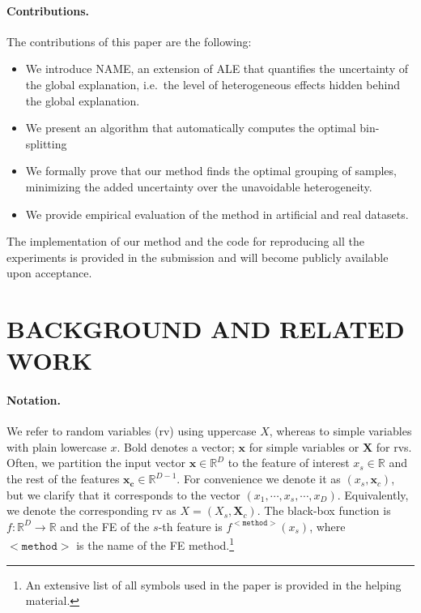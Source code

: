 \documentclass[twoside]{article}
\newcommand{\xc}{\mathbf{x_c}}
\newcommand{\xb}{\mathbf{x}}
\begin{document}
\paragraph{Contributions.} The contributions of this paper are the following:

\begin{itemize}
\item We introduce NAME, an extension of ALE that quantifies the
  uncertainty of the global explanation, i.e.~the level of
  heterogeneous effects hidden behind the global explanation.
\item We present an algorithm that automatically computes the optimal
  bin-splitting
\item We formally prove that our method finds the optimal grouping of
  samples, minimizing the added uncertainty over the unavoidable
  heterogeneity.
\item We provide empirical evaluation of the method in artificial and
  real datasets.
\end{itemize}

The implementation of our method and the code for reproducing all the
experiments is provided in the submission and will become publicly
available upon acceptance.


\section{BACKGROUND AND RELATED WORK}

\paragraph{Notation.} We refer to random variables (rv) using
uppercase \( X \), whereas to simple variables with plain lowercase
\( x \). Bold denotes a vector; \( \xb \) for simple variables or
\(\mathbf{X}\) for rvs. Often, we partition the input vector
\(\xb \in \mathbb{R}^D\) to the feature of interest
\(x_s \in \mathbb{R} \) and the rest of the features
\(\xc \in \mathbb{R}^{D-1}\). For convenience we denote it as
\((x_s, \mathbf{x}_c)\), but we clarify that it corresponds to the
vector \((x_1, \cdots , x_s, \cdots, x_D)\). Equivalently, we denote
the corresponding rv as \(X = (X_s, \mathbf{X}_c)\). The black-box
function is \(f : \mathbb{R}^D \rightarrow \mathbb{R}\) and the
FE of the \(s\)-th feature is
\(f^{\mathtt{<method>}}(x_s)\), where \(\mathtt{<method>}\) is the
name of the FE method.\footnote{An extensive list of all
  symbols used in the paper is provided in the helping material.}
\end{document}
